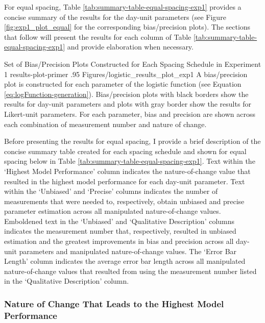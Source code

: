 \documentclass[
12pt, %
twoside,
english]{guelphthesis}
\begin{document}
For equal spacing, Table \ref{tab:summary-table-equal-spacing-exp1} provides a concise summary of the results for the day-unit parameters (see Figure \ref{fig:exp1_plot_equal} for the corresponding bias/precision plots). The sections that follow will present the results for each column of Table \ref{tab:summary-table-equal-spacing-exp1} and provide elaboration when necessary.
\begin{apaFigure}
[portrait]
[samepage]
[-0.2cm]
{Set of Bias/Precision Plots Constructed for Each Spacing Schedule in Experiment 1}
{results-plot-primer}
{.95}
{Figures/logistic_results_plot_exp1}
{A bias/precision plot is constructed for each parameter of the logistic function (see Equation \ref{eq:logFunction-generation}). Bias/precision plots with black borders show the results for day-unit parameters and plots with gray border show the results for Likert-unit parameters. For each parameter, bias and precision are shown across each combination of measurement number and nature of change.}\end{apaFigure}

Before presenting the results for equal spacing, I provide a brief description of the concise summary table created for each spacing schedule and shown for equal spacing below in Table \ref{tab:summary-table-equal-spacing-exp1}. Text within the `Highest Model Performance' column indicates the nature-of-change value that resulted in the highest model performance for each day-unit parameter. Text within the `Unbiased' and `Precise' columns indicates the number of measurements that were needed to, respectively, obtain unbiased and precise parameter estimation across all manipulated nature-of-change values. Emboldened text in the `Unbiased' and `Qualitative Description' columns indicates the measurement number that, respectively, resulted in unbiased estimation and the greatest improvements in bias and precision across all day-unit parameters and manipulated nature-of-change values. The `Error Bar Length' column indicates the average error bar length across all manipulated nature-of-change values that resulted from using the measurement number listed in the `Qualitative Description' column.

\hypertarget{nature-change-equal-exp1}{%
\subsubsection{Nature of Change That Leads to the Highest Model Performance}\label{nature-change-equal-exp1}}
\end{document}

